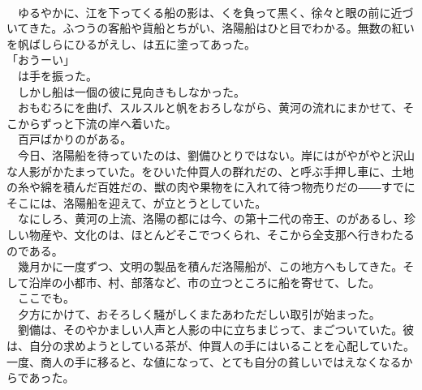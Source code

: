 \documentclass[
  paper=a5,
  fontsize=10pt,
  jafontsize=9.5pt,
  tate,                  %
  open_bracket_pos=nibu, %
]{jlreq}
\begin{document}
\\


　ゆるやかに、江を下ってくる船の影は、くを負って黒く、徐々と眼の前に近づいてきた。ふつうの客船や貨船とちがい、洛陽船はひと目でわかる。無数の紅いを帆ばしらにひるがえし、は五に塗ってあった。\\


「おうーい」\\


　は手を振った。\\


　しかし船は一個の彼に見向きもしなかった。\\


　おもむろにを曲げ、スルスルと帆をおろしながら、黄河の流れにまかせて、そこからずっと下流の岸へ着いた。\\


　百戸ばかりのがある。\\


　今日、洛陽船を待っていたのは、劉備ひとりではない。岸にはがやがやと沢山な人影がかたまっていた。をひいた仲買人の群れだの、と呼ぶ手押し車に、土地の糸や綿を積んだ百姓だの、獣の肉や果物をに入れて待つ物売りだの――すでにそこには、洛陽船を迎えて、が立とうとしていた。\\


　なにしろ、黄河の上流、洛陽の都には今、の第十二代の帝王、のがあるし、珍しい物産や、文化のは、ほとんどそこでつくられ、そこから全支那へ行きわたるのである。\\


　幾月かに一度ずつ、文明の製品を積んだ洛陽船が、この地方へもしてきた。そして沿岸の小都市、村、部落など、市の立つところに船を寄せて、した。\\


　ここでも。\\


　夕方にかけて、おそろしく騒がしくまたあわただしい取引が始まった。\\


　劉備は、そのやかましい人声と人影の中に立ちまじって、まごついていた。彼は、自分の求めようとしている茶が、仲買人の手にはいることを心配していた。一度、商人の手に移ると、な値になって、とても自分の貧しいではえなくなるからであった。\\
\end{document}

